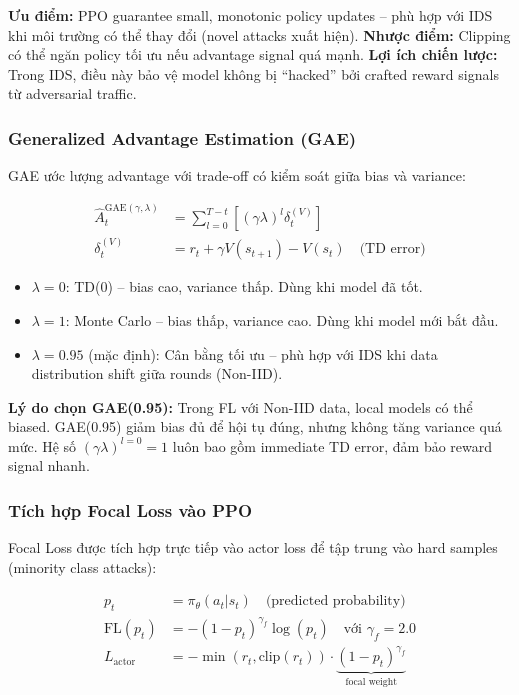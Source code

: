 \documentclass[12pt,a4paper]{article}
\begin{document}
\textbf{Ưu điểm:} PPO guarantee small, monotonic policy updates -- phù hợp với IDS khi môi trường có thể thay đổi (novel attacks xuất hiện). \textbf{Nhược điểm:} Clipping có thể ngăn policy tối ưu nếu advantage signal quá mạnh. \textbf{Lợi ích chiến lược:} Trong IDS, điều này bảo vệ model không bị ``hacked'' bởi crafted reward signals từ adversarial traffic.

\subsubsection{Generalized Advantage Estimation (GAE)}

GAE ước lượng advantage với trade-off có kiểm soát giữa bias và variance:

\begin{align}
    \hat{A}_t^{\text{GAE}(\gamma,\lambda)} &= \sum_{l=0}^{T-t}\left[(\gamma\lambda)^l \delta_t^{(V)}\right] \label{eq:gae} \\
    \delta_t^{(V)} &= r_t + \gamma V(s_{t+1}) - V(s_t) \quad \text{(TD error)} \label{eq:td_error}
\end{align}

\begin{itemize}
    \item $\lambda = 0$: TD(0) -- bias cao, variance thấp. Dùng khi model đã tốt.
    \item $\lambda = 1$: Monte Carlo -- bias thấp, variance cao. Dùng khi model mới bắt đầu.
    \item $\lambda = 0.95$ (mặc định): Cân bằng tối ưu -- phù hợp với IDS khi data distribution shift giữa rounds (Non-IID).
\end{itemize}

\textbf{Lý do chọn GAE(0.95):} Trong FL với Non-IID data, local models có thể biased. GAE(0.95) giảm bias đủ để hội tụ đúng, nhưng không tăng variance quá mức. Hệ số $(\gamma\lambda)^{l=0} = 1$ luôn bao gồm immediate TD error, đảm bảo reward signal nhanh.

\subsubsection{Tích hợp Focal Loss vào PPO}

Focal Loss được tích hợp trực tiếp vào actor loss để tập trung vào hard samples (minority class attacks):

\begin{align}
    p_t &= \pi_\theta(a_t|s_t) \quad \text{(predicted probability)} \label{eq:focal_pt} \\
    \text{FL}(p_t) &= -(1 - p_t)^{\gamma_f} \log(p_t) \quad \text{với } \gamma_f = 2.0 \label{eq:focal_loss} \\
    L_{\text{actor}} &= -\min(r_t, \text{clip}(r_t)) \cdot \underbrace{(1-p_t)^{\gamma_f}}_{\text{focal weight}} \label{eq:actor_loss_focal}
\end{align}
\end{document}
